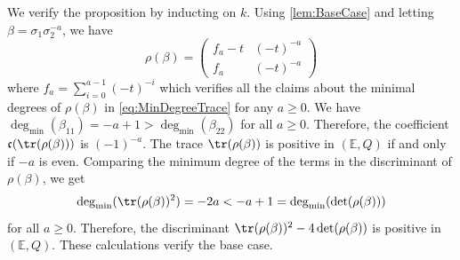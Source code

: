 \documentclass{amsart}
\makeatletter
\renewenvironment{proof}[1][\proofname]{%
   \par\pushQED{\qed}\normalfont%
   \topsep6\p@\@plus6\p@\relax
   \trivlist\item[\hskip\labelsep\bfseries#1\@addpunct{.}]%
   \ignorespaces
}{%
   \popQED\endtrivlist\@endpefalse
}
\makeatother
\begin{document}
\begin{proof}
    We verify the proposition by inducting on $k$. Using \cref{lem:BaseCase} and letting $\beta =\sigma_1\sigma_2^{-a}$, we have
    \[
    \rho(\beta) = \begin{pmatrix}
        f_a - t & (-t)^{-a} \\ f_a  & (-t)^{-a}
    \end{pmatrix}
    \]
    where $f_a = \sum\limits_{i=0}^{a-1}(-t)^{-i}$ which verifies all the claims about the minimal degrees of $\rho(\beta)$ in \cref{eq:MinDegreeTrace} for any $a \geq 0$. We have $\deg_{\min}(\beta_{11}) = -a + 1 > \deg_{\min}(\beta_{22})$ for all $a \geq 0$. Therefore, the coefficient $\mathfrak{c}(\tr(\rho(\beta)))$ is $(-1)^{-a}$. The trace $\tr(\rho(\beta))$ is positive in $(\mathbb{E},Q)$ if and only if $-a$ is even. Comparing the minimum degree of the terms in the discriminant of $\rho(\beta)$, we get 
    \[
    \deg_{\min}(\tr(\rho(\beta))^2) = -2a < -a + 1 = \deg_{\min}(\det(\rho(\beta)))\] 
    for all $a \geq 0$. Therefore, the discriminant $\tr(\rho(\beta))^2 - 4\det(\rho(\beta))$ is positive in $(\mathbb{E},Q)$. These calculations verify the base case. 


\end{proof}
\end{document}
